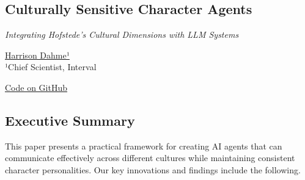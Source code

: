 \documentclass[
]{article}
\author{}
\date{}
\begin{document}
\begin{center}
\section{Culturally Sensitive Character Agents}
\textit{Integrating Hofstede's Cultural Dimensions with LLM Systems}\\[0.5em]
\label{culturally-sensitive-character-agents-integrating-hofstedes-cultural-dimensions-with-llm-systems}
\end{center}


\begin{center}
\href{mailto:harrison@interval.xyz}{Harrison Dahme¹}\\
¹Chief Scientist, Interval

\href{https://github.com/hdahme/culturally_sensitive_agents}{Code on GitHub} {\faGithub}
\end{center}

\subsection{Executive Summary}\label{executive-summary}

This paper presents a practical framework for creating AI agents that
can communicate effectively across different cultures while maintaining
consistent character personalities. Our key innovations and findings
include the following.
\end{document}
